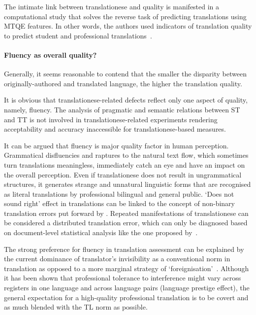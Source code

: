The intimate link between translationese and quality is manifested in a computational study that solves the reverse task of predicting translations using \gls{MTQE} features. In other words, the authors used indicators of translation quality to predict student and professional translations~\cite{Rubino2016}.

\paragraph{Fluency as overall quality?}
Generally, it seems reasonable to contend that the smaller the disparity between originally-authored and translated language, the higher the translation quality.

It is obvious that translationese-related defects reflect only one aspect of quality, namely, fluency. The analysis of pragmatic and semantic relations between ST and TT is not involved in translationese-related experiments rendering acceptability and accuracy inaccessible for translationese-based measures.

It can be argued that fluency is major quality factor in human perception. Grammatical disfluencies and raptures to the natural text flow, which sometimes turn translations meaningless, immediately catch an eye and have an impact on the overall perception. Even if translationese does not result in ungrammatical structures, it generates strange and unnatural linguistic forms that are recognised as literal translations by professional bilingual and general public. `Does not sound right' effect in translations can be linked to the concept of non-binary translation errors put forward by \citet{Pym1992}. Repeated manifestations of translationese can be considered a distributed translation error, which can only be diagnosed based on document-level statistical analysis like the one proposed by~\citet{Sutter2017}. 

The strong preference for fluency in translation assessment can be explained by the current dominance of translator's invisibility as a conventional norm in translation as opposed to a more marginal strategy of `foreignisation'~\cite{Venuti1995}. 
Although it has been shown that professional tolerance to interference might vary across registers in one language and across language pairs (language prestige effect), the general expectation for a high-quality professional translation is to be covert and as much blended with the TL norm as possible. 

